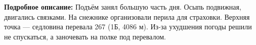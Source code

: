 

\begin{tourinfotable}
\end{tourinfotable}

\textbf{Подробное описание:}
Подъём занял большую часть дня. Осыпь подвижная, двигались связками. На снежнике организовали перила для страховки. Верхняя точка — седловина перевала 267 (1Б, 4086 м). Из-за ухудшения погоды решили не спускаться, а заночевать на полке под перевалом.

